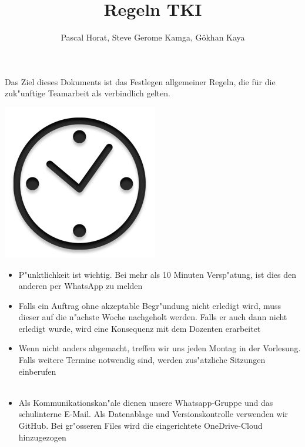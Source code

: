 \documentclass[11pt]{article}
\title{Regeln TKI}
\author{Pascal Horat, Steve Gerome Kamga, Gökhan Kaya}
\begin{document}
\maketitle

Das Ziel dieses Dokuments ist das Festlegen allgemeiner Regeln, die für die zuk"unftige Teamarbeit als verbindlich gelten.\\

\begin{center}
\includegraphics[scale=0.2]{clock}\\
\end{center}


\begin{itemize}
\item P"unktlichkeit ist wichtig. Bei mehr als 10 Minuten Versp"atung, ist dies den anderen per WhatsApp zu melden
\end{itemize}

\begin{itemize}
\item Falls ein Auftrag ohne akzeptable Begr"undung nicht erledigt wird, muss dieser auf die n"achste Woche nachgeholt werden. Falls er auch dann nicht erledigt wurde, wird eine Konsequenz mit dem Dozenten erarbeitet
\end{itemize}

\begin{itemize}
\item Wenn nicht anders abgemacht, treffen wir uns jeden Montag in der Vorlesung. Falls weitere Termine notwendig sind, werden zus"atzliche Sitzungen einberufen \\\\
\end{itemize}

\begin{itemize}
\item Als Kommunikationskan"ale dienen unsere Whatsapp-Gruppe und das schulinterne E-Mail. Als Datenablage und Versionskontrolle verwenden wir GitHub. Bei gr"osseren Files wird die eingerichtete OneDrive-Cloud hinzugezogen\\\\
\end{itemize}
\end{document}
